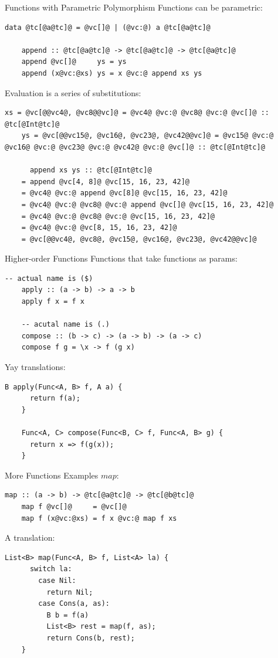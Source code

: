 \documentclass[xcolor={usenames,dvipsnames}]{beamer}
\begin{document}
\begin{frame}[fragile]{Functions with Parametric Polymorphism}
  Functions can be parametric:
  \begin{lstlisting}[style=hask]
    data @tc[@a@tc]@ = @vc[]@ | (@vc:@) a @tc[@a@tc]@

    append :: @tc[@a@tc]@ -> @tc[@a@tc]@ -> @tc[@a@tc]@
    append @vc[]@     ys = ys
    append (x@vc:@xs) ys = x @vc:@ append xs ys
  \end{lstlisting}

  Evaluation is a series of substitutions:
  \begin{lstlisting}[style=hask]
    xs = @vc[@@vc4@, @vc8@@vc]@ = @vc4@ @vc:@ @vc8@ @vc:@ @vc[]@ :: @tc[@Int@tc]@
    ys = @vc[@@vc15@, @vc16@, @vc23@, @vc42@@vc]@ = @vc15@ @vc:@ @vc16@ @vc:@ @vc23@ @vc:@ @vc42@ @vc:@ @vc[]@ :: @tc[@Int@tc]@

      append xs ys :: @tc[@Int@tc]@
    = append @vc[4, 8]@ @vc[15, 16, 23, 42]@
    = @vc4@ @vc:@ append @vc[8]@ @vc[15, 16, 23, 42]@
    = @vc4@ @vc:@ @vc8@ @vc:@ append @vc[]@ @vc[15, 16, 23, 42]@
    = @vc4@ @vc:@ @vc8@ @vc:@ @vc[15, 16, 23, 42]@
    = @vc4@ @vc:@ @vc[8, 15, 16, 23, 42]@
    = @vc[@@vc4@, @vc8@, @vc15@, @vc16@, @vc23@, @vc42@@vc]@
  \end{lstlisting}
\end{frame}

\begin{frame}[fragile]{Higher-order Functions}
  Functions that take functions as params:
  \begin{lstlisting}[style=hask]
    -- actual name is ($)
    apply :: (a -> b) -> a -> b
    apply f x = f x

    -- acutal name is (.)
    compose :: (b -> c) -> (a -> b) -> (a -> c)
    compose f g = \x -> f (g x)
  \end{lstlisting}

  \pause
  Yay translations:
  \begin{lstlisting}[style=hask]
    B apply(Func<A, B> f, A a) {
      return f(a);
    }

    Func<A, C> compose(Func<B, C> f, Func<A, B> g) {
      return x => f(g(x));
    }
  \end{lstlisting}
\end{frame}

\begin{frame}[fragile]{More Functions Examples}
  $map$:
  \begin{lstlisting}[style=hask]
    map :: (a -> b) -> @tc[@a@tc]@ -> @tc[@b@tc]@
    map f @vc[]@     = @vc[]@
    map f (x@vc:@xs) = f x @vc:@ map f xs
  \end{lstlisting}

  \pause
  A translation:
  \begin{lstlisting}[style=hask]
    List<B> map(Func<A, B> f, List<A> la) {
      switch la:
        case Nil:
          return Nil;
        case Cons(a, as):
          B b = f(a)
          List<B> rest = map(f, as);
          return Cons(b, rest);
    }
  \end{lstlisting}
\end{frame}
\end{document}
